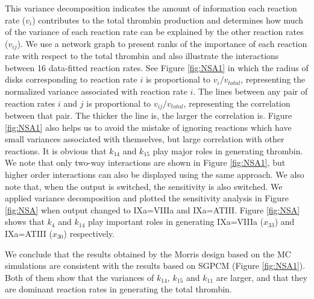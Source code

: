 This variance decomposition indicates the amount of information each
reaction rate ($v_i$) contributes to the total thrombin production
and determines how much of the variance of each reaction rate can be
explained by the other reaction rates ($v_{ij}$). We use a network
graph to present ranks of the importance of each reaction rate with
respect to the total thrombin and also illustrate the interactions
between 16 data-fitted reaction rates. See
 Figure \ref{fig:NSA1} in which the radius of disks
corresponding to reaction rate $i$ is proportional to
$v_i/v_{total}$, representing the normalized variance associated
with reaction rate $i$. The lines between any pair of reaction rates
$i$ and $j$ is proportional to $v_{ij}/v_{total}$, representing the
correlation between that pair. The thicker the line is, the larger
the correlation is. Figure \ref{fig:NSA1} also helps us to avoid the
mistake of ignoring reactions which have small variances associated
with themselves, but large correlation with other reactions. It is
obvious that $k_{14}$ and $k_{15}$ play  major roles in generating
thrombin. We note that only two-way interactions are shown in Figure
\ref{fig:NSA1}, but higher order interactions can also be displayed
using the same approach. We also note that, when the output is
switched, the sensitivity is also switched. We applied variance
decomposition and plotted the sensitivity analysis in Figure
\ref{fig:NSA} when output changed to IXa=VIIIa and IXa=ATIII. Figure
\ref{fig:NSA} shows that $k_4$ and $k_{14}$ play important roles in
generating IXa=VIIIa ($x_{33}$) and IXa=ATIII ($x_{30}$)
respectively.


We conclude that the results obtained by the Morris design based on
the MC simulations are consistent with the results based on SGPCM
(Figure \ref{fig:NSA1}). Both of them show that the variances of
$k_{14}$, $k_{15}$ and $k_{11}$ are larger, and that they are
dominant reaction rates in generating the total thrombin.

